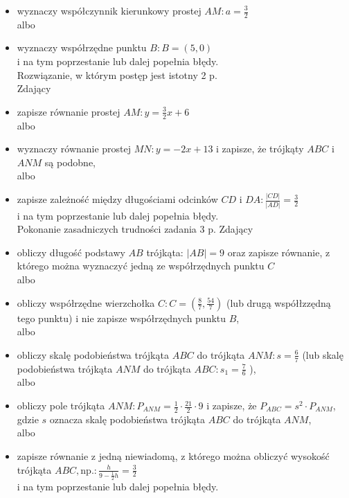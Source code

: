 \documentclass[10pt]{article}
\begin{document}
\begin{itemize}
  \item wyznaczy współczynnik kierunkowy prostej $A M: a=\frac{3}{2}$\\
albo
  \item wyznaczy współrzędne punktu $B: B=(5,0)$\\
i na tym poprzestanie lub dalej popełnia błędy.\\
Rozwiązanie, w którym postęp jest istotny 2 p.\\
Zdający
  \item zapisze równanie prostej $A M: y=\frac{3}{2} x+6$\\
albo
  \item wyznaczy równanie prostej $M N: y=-2 x+13$ i zapisze, że trójkąty $A B C$ i $A N M$ są podobne,\\
albo
  \item zapisze zależność między długościami odcinków $C D$ i $D A: \frac{|C D|}{|A D|}=\frac{3}{2}$\\
i na tym poprzestanie lub dalej popełnia błędy.\\
Pokonanie zasadniczych trudności zadania 3 p. Zdający
  \item obliczy długość podstawy $A B$ trójkąta: $|A B|=9$ oraz zapisze równanie, z którego można wyznaczyć jedną ze współrzędnych punktu $C$\\
albo
  \item obliczy współrzędne wierzchołka $C: C=\left(\frac{8}{7}, \frac{54}{7}\right)$ (lub drugą współłzzędną tego punktu) i nie zapisze współrzędnych punktu $B$,\\
albo
  \item obliczy skalę podobieństwa trójkąta $A B C$ do trójkąta $A N M: s=\frac{6}{7}$ (lub skalę podobieństwa trójkąta $A N M$ do trójkąta $A B C: s_{1}=\frac{7}{6}$ ),\\
albo
  \item obliczy pole trójkąta $A N M: P_{A N M}=\frac{1}{2} \cdot \frac{21}{2} \cdot 9$ i zapisze, że $P_{A B C}=s^{2} \cdot P_{A N M}$, gdzie $s$ oznacza skalę podobieństwa trójkąta $A B C$ do trójkąta $A N M$,\\
albo
  \item zapisze równanie z jedną niewiadomą, z którego można obliczyć wysokość trójkąta $A B C, \mathrm{np} .: \frac{h}{9-\frac{1}{2} h}=\frac{3}{2}$\\
i na tym poprzestanie lub dalej popełnia błędy.
\end{itemize}
\end{document}
